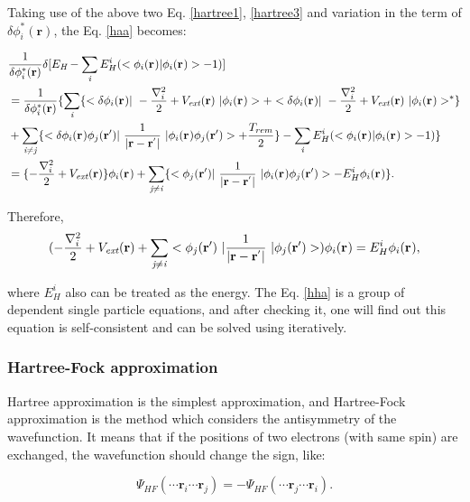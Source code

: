 \documentclass[a4paper, 12pt, titlepage,oneside,drop]{kthesis}
\begin{document}
Taking use of the above two Eq. \ref{hartree1}, \ref{hartree3} and variation in the term of  $\delta \phi^{*}_{i}(\textbf{r}{}) $, the Eq. \ref{haa} becomes:

\begin{equation}
\begin{split}\label{hha}
& \frac{1}{\delta  \phi^{*}_{i}(\textbf{r}{})} \delta [ E_{\textit{H}} - \sumi<i> E^{i}_{H} (<\bwf<i><> | \bwf<i><> > -1)] \\
&  = \frac{1}{\delta  \phi^{*}_{i}(\textbf{r}{})} \{ \sumi<i> \{ < \delta \bwf<i><> |\ -\frac{\nabla^{2}_{i}}{2} + V_\textit{ext}(\textbf{r})  \ | \bwf<i><> > + <  \delta \bwf<i><> |\ -\frac{\nabla^{2}_{i}}{2} + V_\textit{ext}(\textbf{r})  \ |  \bwf<i><> >^{\ast} \} \\
& +  \suminj<i><j> \{  <\delta \bwf<i><> \bwfn<j><'>|\ \frac{1}{|\textbf{r} - \textbf{r}^{'} |} \ | \bwf<i><> \bwfn<j><'>> + \frac{T_{rem}}{2}\} - \sumi<i> E^{i}_{H} (<\bwf<i><> | \bwf<i><> > -1) \} \\
& =  { \{-\frac{\nabla^{2}_{i}}{2} + V_\textit{ext}(\textbf{r})} \}  \bwf<i><> +  \suminj<j><i> \{  <\bwfn<j><'>|\ \frac{1}{|\textbf{r} - \textbf{r}^{'} |} \ | \bwf<i><> \bwfn<j><'>> - E^{i}_{H}  \bwf<i><>  \}.
\end{split}
\end{equation}

Therefore,
\begin{equation}
(-\frac{\nabla^{2}_{i}}{2} + V_\textit{ext}(\textbf{r})+ \suminj<j><i> <\bwfn<j><'>\ | \frac{1}{|\textbf{r} - \textbf{r}^{'} |} \ | \bwfn<j><'>>) \bwf<i><> = E^{i}_{H} \bwf<i><>,
\end{equation}

where $E^{i}_{H}$  also can be treated as the energy. The Eq. \ref{hha} is a group of dependent single
 particle equations, and after checking it, one will find out this equation is self-consistent and can be solved using iteratively.

\subsubsection{Hartree-Fock approximation}
Hartree approximation is the simplest approximation, and Hartree-Fock approximation is the method which considers the 
antisymmetry of the wavefunction. It means that if the positions of two electrons (with same spin) are exchanged, the wavefunction should change the sign, like:

\begin{equation}\label{hfwf}
\Psi_\textit{HF} ( \cdots \textbf{r}_\textit{i} \cdots  \textbf{r}_\textit{j} ) = - \Psi_\textit{HF} ( \cdots \textbf{r}_\textit{j} \cdots  \textbf{r}_\textit{i} ).
\end{equation}
\end{document}
